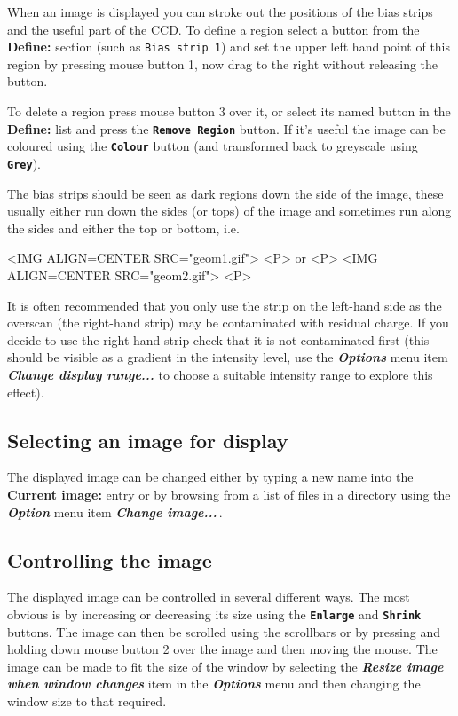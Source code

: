 \documentclass[11pt,nolof]{starlink}
\providecommand{\butt}[1]{{\bf \tt #1}}
\providecommand{\menu}[1]{{\bf \em #1}}
\providecommand{\wlab}[1]{{\bf #1}}
\providecommand{\text}[1]{{\tt #1}}
\begin{document}
When an image is displayed you can stroke out the positions of the
bias strips and the useful part of the CCD. To define a region select
a button from the \wlab{Define:} section (such as \text{Bias strip 1})
and set the upper left hand point of this region by pressing mouse
button 1, now drag to the right without releasing the button.

To delete a region press mouse button 3 over it, or select its named
button in the \wlab{Define:} list and press the \butt{Remove Region}
button. If it's useful the image can be coloured using the
\butt{Colour} button (and transformed back to greyscale using \butt{Grey}).

The bias strips should be seen as dark regions down the side of the
image, these usually either run down the sides (or tops) of the image
and sometimes run along the sides and either the top or bottom, i.e.

\begin{html}
<IMG ALIGN=CENTER SRC="geom1.gif">
<P>
or
<P>
<IMG ALIGN=CENTER SRC="geom2.gif">
<P>
\end{html}

It is often recommended that you only use the strip on the left-hand
side as the overscan (the right-hand strip) may be contaminated with
residual charge. If you decide to use the right-hand strip check that
it is not contaminated first (this should be visible as a gradient in
the intensity level, use the \menu{Options} menu item
\menu{Change display range...} to choose a suitable intensity range
to explore this effect).

\subsection{Selecting an image for display }
The displayed image can be changed either by typing a new name into
the \wlab{Current image:} entry or by browsing from a list of files in a
directory using the \menu{Option} menu item \menu{Change image...}\,.

\subsection{Controlling the image }
The displayed image can be controlled in several different ways. The
most obvious is by increasing or decreasing its size using the
\butt{Enlarge} and \butt{Shrink} buttons. The image can then be
scrolled using the scrollbars or by pressing and holding down mouse
button 2 over the image and then moving the mouse. The image can be
made to fit the size of the window by selecting the \menu{Resize image
when window changes} item in the \menu{Options} menu and then
changing the window size to that required.
\end{document}
